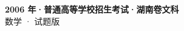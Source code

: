 \documentclass[zihao=-4, a4paper]{ctexart}
\begin{document}
\begin{center}
  {\Large\bfseries 2006 年·普通高等学校招生考试·湖南卷文科}\\[4pt]
  {\large 数学 · 试题版}
\end{center}
\medskip
{}

\end{document}
